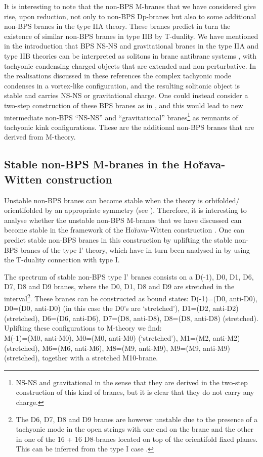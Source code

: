 \documentclass[12pt,a4paper]{article}
\begin{document}
It is interesting to note that the non-BPS M-branes that we have
considered give rise, upon reduction, not only to non-BPS 
Dp-branes but also to some additional non-BPS branes in
the type IIA theory. These branes predict in turn the existence of
similar non-BPS branes in type IIB by T-duality. We have mentioned in the
introduction that
BPS NS-NS and gravitational branes \cite{Hull} in the type IIA and
type IIB theories can be interpreted as solitons in brane antibrane
systems \cite{Yi, HL1}, with tachyonic condensing charged
objects that are extended and non-perturbative. In the realisations 
discussed in these references the complex tachyonic
mode condenses in a vortex-like configuration, and the resulting 
solitonic object is stable and carries NS-NS or gravitational charge.
One could instead consider a two-step construction of these BPS branes
as in \cite{Sen1,Sen3}, and this would lead to new 
intermediate non-BPS ``NS-NS'' and ``gravitational''
branes\footnote{NS-NS and gravitational in the sense that they are
derived in the two-step construction of this kind of branes, but
it is clear that they do not carry any charge.} 
as remnants of tachyonic kink configurations. These are the 
additional non-BPS branes that are derived from M-theory. 

\subsection{Stable non-BPS M-branes in the Ho\u{r}ava-Witten construction}

Unstable non-BPS branes can become stable when
the theory is orbifolded/ orientifolded by an appropriate 
symmetry (see \cite{reva}). 
Therefore, it is interesting to analyse whether the 
unstable non-BPS M-branes that we have discussed can become stable in
the framework of the Ho\u{r}ava-Witten construction \cite{HW}.
One can predict stable non-BPS
branes in this construction by uplifting the stable non-BPS branes of
the type I' theory, which have in turn been analysed in \cite{BGH} 
by using the T-duality connection with type I.

The spectrum of stable non-BPS type I' branes consists on a D(-1),
D0, D1, D6, D7, D8 and D9 branes, where the D0, D1, D8 and D9 are
stretched in the interval\footnote{The D6, D7, D8 and D9
branes are however unstable due to the presence of a tachyonic mode
in the open strings with one end on the brane and the other in one
of the 16 + 16 D8-branes located on top of the orientifold
fixed planes. This can be inferred from the type I
case \cite{FGLS}.}.
These branes can be constructed as bound
states: D(-1)=(D0, anti-D0), D0=(D0, anti-D0) (in this case the
D0's are `stretched'), D1=(D2, anti-D2) (stretched),
D6=(D6, anti-D6), D7=(D8, anti-D8), D8=(D8, anti-D8) (stretched).  
Uplifting these configurations
to M-theory we find: \\
M(-1)=(M0, anti-M0), M0=(M0, anti-M0) 
(`stretched'), M1=(M2, anti-M2) (stretched), M6=(M6, anti-M6),
M8=(M9, anti-M9), M9=(M9, anti-M9) (stretched), together with a
stretched M10-brane. 
\end{document}
